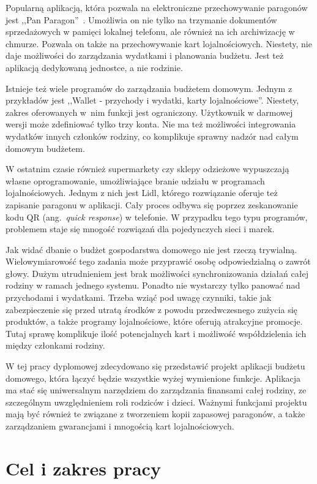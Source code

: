 Popularną aplikacją, która pozwala na elektroniczne przechowywanie paragonów jest ,,Pan Paragon''~\cite{pan-paragon}. Umożliwia on nie tylko na trzymanie dokumentów sprzedażowych w pamięci lokalnej telefonu, ale również na ich archiwizację w chmurze. Pozwala on także na przechowywanie kart lojalnościowych. Niestety, nie daje możliwości do zarządzania wydatkami i planowania budżetu. Jest też aplikacją dedykowaną jednostce, a nie rodzinie.

Istnieje też wiele programów do zarządzania budżetem domowym. Jednym z przykładów jest ,,Wallet - przychody i wydatki, karty lojalnościowe''\cite{wallet-wydatki}. Niestety, zakres oferowanych w~nim funkcji jest ograniczony. Użytkownik w darmowej wersji może zdefiniować tylko trzy konta. Nie ma też możliwości integrowania wydatków innych członków rodziny, co komplikuje sprawny nadzór nad całym domowym budżetem.

W ostatnim czasie również supermarkety czy sklepy odzieżowe wypuszczają własne oprogramowanie, umożliwiające branie udziału w programach lojalnościowych. Jednym z nich jest Lidl, którego rozwiązanie oferuje też zapisanie paragonu w aplikacji. Cały proces odbywa się poprzez zeskanowanie kodu QR (ang.~\emph{quick response}) w telefonie. W przypadku tego typu programów, problemem staje się mnogość rozwiązań dla pojedynczych sieci i marek.

Jak widać dbanie o budżet gospodarstwa domowego nie jest rzeczą trywialną. Wielowymiarowość tego zadania może przyprawić osobę odpowiedzialną o zawrót głowy. Dużym utrudnieniem jest brak możliwości synchronizowania działań całej rodziny w ramach jednego systemu. Ponadto nie wystarczy tylko panować nad przychodami i wydatkami. Trzeba wziąć pod uwagę czynniki, takie jak zabezpieczenie się przed utratą środków z powodu przedwczesnego zużycia się produktów, a także  programy lojalnościowe, które oferują atrakcyjne promocje. Tutaj sprawę komplikuje ilość potencjalnych kart i możliwość współdzielenia ich między członkami rodziny. 

W tej pracy dyplomowej zdecydowano się przedstawić projekt aplikacji budżetu domowego, która łączyć będzie wszystkie wyżej wymienione funkcje. Aplikacja ma stać się uniwersalnym narzędziem do zarządzania finansami całej rodziny, ze szczególnym uwzględnieniem roli rodziców i dzieci. Ważnymi funkcjami projektu mają być również te związane z tworzeniem kopii zapasowej paragonów, a także zarządzaniem gwarancjami i mnogością kart lojalnościowych.

\section{Cel i zakres pracy}
\label{sec:cel-zakres}

